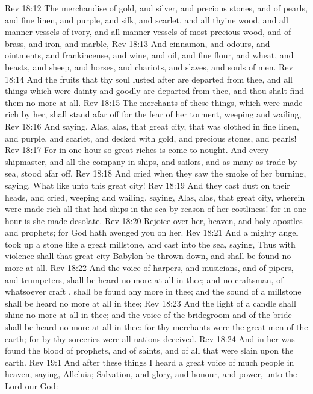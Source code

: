 \vs Rev 18:12 The merchandise of gold, and silver, and precious stones, and of pearls, and fine linen, and purple, and silk, and scarlet, and all thyine wood, and all manner vessels of ivory, and all manner vessels of most precious wood, and of brass, and iron, and marble,
\vs Rev 18:13 And cinnamon, and odours, and ointments, and frankincense, and wine, and oil, and fine flour, and wheat, and beasts, and sheep, and horses, and chariots, and slaves, and souls of men.
\vs Rev 18:14 And the fruits that thy soul lusted after are departed from thee, and all things which were dainty and goodly are departed from thee, and thou shalt find them no more at all.
\vs Rev 18:15 The merchants of these things, which were made rich by her, shall stand afar off for the fear of her torment, weeping and wailing,
\vs Rev 18:16 And saying, Alas, alas, that great city, that was clothed in fine linen, and purple, and scarlet, and decked with gold, and precious stones, and pearls!
\vs Rev 18:17 For in one hour so great riches is come to nought. And every shipmaster, and all the company in ships, and sailors, and as many as trade by sea, stood afar off,
\vs Rev 18:18 And cried when they saw the smoke of her burning, saying, What  like unto this great city!
\vs Rev 18:19 And they cast dust on their heads, and cried, weeping and wailing, saying, Alas, alas, that great city, wherein were made rich all that had ships in the sea by reason of her costliness! for in one hour is she made desolate.
\vs Rev 18:20 Rejoice over her,  heaven, and  holy apostles and prophets; for God hath avenged you on her.
\vs Rev 18:21 And a mighty angel took up a stone like a great millstone, and cast  into the sea, saying, Thus with violence shall that great city Babylon be thrown down, and shall be found no more at all.
\vs Rev 18:22 And the voice of harpers, and musicians, and of pipers, and trumpeters, shall be heard no more at all in thee; and no craftsman, of whatsoever craft , shall be found any more in thee; and the sound of a millstone shall be heard no more at all in thee;
\vs Rev 18:23 And the light of a candle shall shine no more at all in thee; and the voice of the bridegroom and of the bride shall be heard no more at all in thee: for thy merchants were the great men of the earth; for by thy sorceries were all nations deceived.
\vs Rev 18:24 And in her was found the blood of prophets, and of saints, and of all that were slain upon the earth.
\vs Rev 19:1 And after these things I heard a great voice of much people in heaven, saying, Alleluia; Salvation, and glory, and honour, and power, unto the Lord our God:
